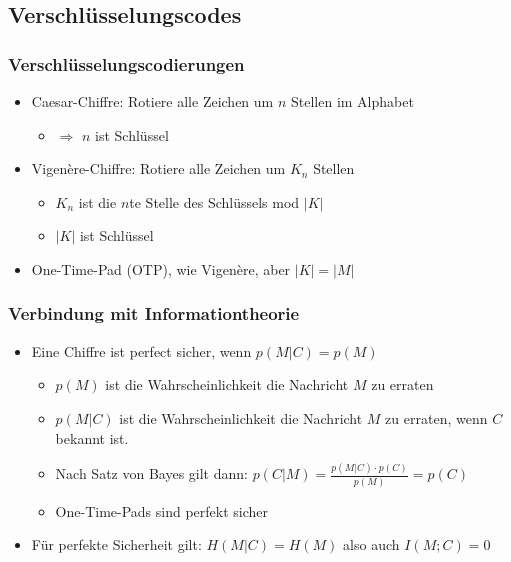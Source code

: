 \subsection{Verschlüsselungscodes}
\begin{frame}
	\frametitle{Verschlüsselungscodierungen}
	\begin{itemize}
		\item Caesar-Chiffre: Rotiere alle Zeichen um $n$ Stellen im Alphabet
		\begin{itemize}
			\item $\Rightarrow$ $n$ ist Schlüssel
		\end{itemize}
		\item Vigenère-Chiffre: Rotiere alle Zeichen um $K_n$ Stellen
		\begin{itemize}
			\item $K_n$ ist die $n$te Stelle des Schlüssels mod $|K|$
			\item $|K|$ ist Schlüssel
		\end{itemize}
		\item One-Time-Pad (OTP), wie Vigenère, aber $|K| = |M|$
	\end{itemize}
\end{frame}

\begin{frame}
	\frametitle{Verbindung mit Informationtheorie}
	\begin{itemize}
		\item Eine Chiffre ist perfect sicher, wenn $p(M|C) = p(M)$
		\begin{itemize}
			\item $p(M)$ ist die Wahrscheinlichkeit  die Nachricht $M$ zu erraten
			\item $p(M|C)$ ist die Wahrscheinlichkeit die Nachricht $M$ zu erraten, wenn $C$ bekannt ist.
			\item Nach Satz von Bayes gilt dann: $p(C|M)=\frac{p(M|C)\cdot p(C)}{p(M)} = p(C)$
			\item One-Time-Pads sind perfekt sicher
		\end{itemize}
		\item Für perfekte Sicherheit gilt: $H(M|C) = H(M)$ also auch $I(M;C) = 0$
	\end{itemize}
\end{frame}

